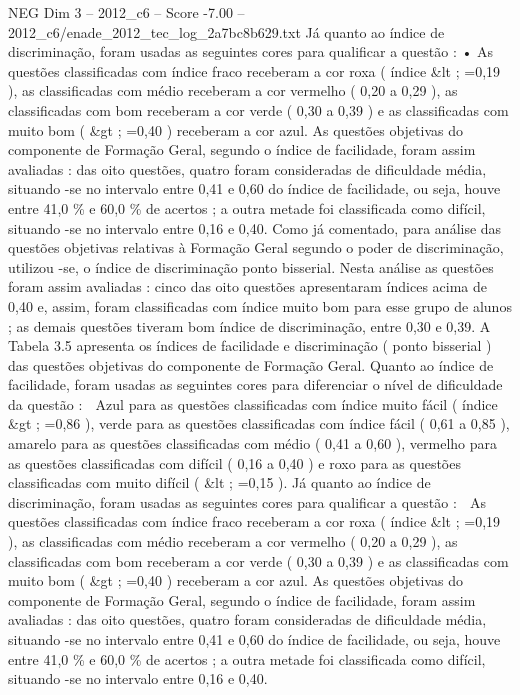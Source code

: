 \begin{textsample}{NEG Dim 3 – 2012\_c6 – Score -7.00 – 2012\_c6/enade\_2012\_tec\_log\_2a7bc8b629.txt}
Já quanto ao índice de discriminação, foram usadas as seguintes cores para qualificar a questão : • As questões classificadas com índice fraco receberam a cor roxa ( índice \&lt ; =0,19 ), as classificadas com médio receberam a cor vermelho ( 0,20 a 0,29 ), as classificadas com bom receberam a cor verde ( 0,30 a 0,39 ) e as classificadas com muito bom ( \&gt ; =0,40 ) receberam a cor azul.
As questões objetivas do componente de Formação Geral, segundo o índice de facilidade, foram assim avaliadas : das oito questões, quatro foram consideradas de dificuldade média, situando -se no intervalo entre 0,41 e 0,60 do índice de facilidade, ou seja, houve entre 41,0 \% e 60,0 \% de acertos ; a outra metade foi classificada como difícil, situando -se no intervalo entre 0,16 e 0,40.
Como já comentado, para análise das questões objetivas relativas à Formação Geral segundo o poder de discriminação, utilizou -se, o índice de discriminação ponto bisserial.
Nesta análise as questões foram assim avaliadas : cinco das oito questões apresentaram índices acima de 0,40 e, assim, foram classificadas com índice muito bom para esse grupo de alunos ; as demais questões tiveram bom índice de discriminação, entre 0,30 e 0,39.
A Tabela 3.5 apresenta os índices de facilidade e discriminação ( ponto bisserial ) das questões objetivas do componente de Formação Geral.
Quanto ao índice de facilidade, foram usadas as seguintes cores para diferenciar o nível de dificuldade da questão :  Azul para as questões classificadas com índice muito fácil ( índice \&gt ; =0,86 ), verde para as questões classificadas com índice fácil ( 0,61 a 0,85 ), amarelo para as questões classificadas com médio ( 0,41 a 0,60 ), vermelho para as questões classificadas com difícil ( 0,16 a 0,40 ) e roxo para as questões classificadas com muito difícil ( \&lt ; =0,15 ).
Já quanto ao índice de discriminação, foram usadas as seguintes cores para qualificar a questão :  As questões classificadas com índice fraco receberam a cor roxa ( índice \&lt ; =0,19 ), as classificadas com médio receberam a cor vermelho ( 0,20 a 0,29 ), as classificadas com bom receberam a cor verde ( 0,30 a 0,39 ) e as classificadas com muito bom ( \&gt ; =0,40 ) receberam a cor azul.
As questões objetivas do componente de Formação Geral, segundo o índice de facilidade, foram assim avaliadas : das oito questões, quatro foram consideradas de dificuldade média, situando -se no intervalo entre 0,41 e 0,60 do índice de facilidade, ou seja, houve entre 41,0 \% e 60,0 \% de acertos ; a outra metade foi classificada como difícil, situando -se no intervalo entre 0,16 e 0,40.

\end{textsample}
